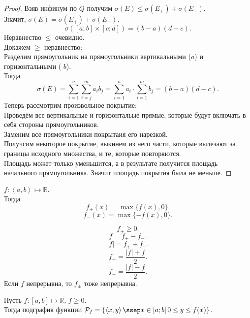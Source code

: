 \documentclass[11pt, oneside]{article}   	%
\begin{document}
\begin{theorem}
\begin{proof}
            Взяв инфинум по $Q$ получим $\sigma(E) \le \sigma(E_{+}) + \sigma(E_{-})$.\\
            Значит, $\sigma(E) = \sigma(E_{+}) + \sigma(E_{-})$.\\
            \[ \sigma([a; b] \times [c; d]) = (b-a)(d-c) .\]
            Неравнество $\le$ очевидно.\\
            Докажем $\ge$ неравнество:\\
            Разделим прямоугольник на прямоугольники вертикальными ($a$) и горизонтальными ( $b$).\\
            Тогда 
            \[ \sigma(E) = \sum\limits_{i=1}^{n}\sum\limits_{i=j}^{m}a_ib_j = \sum\limits_{i=1}^{n}a_i \cdot \sum\limits_{i=1}^{m} b_j = (b-a)(d-c) .\]
            Теперь рассмотрим произвольное покрытие:\\
            Проведём все вертикальные и горизонтальые прямые, которые будут включать в себя стороны прямоугольников.\\
            Заменим все прямоугольники покрытаия его нарезкой.\\
            Получсим некоторое покрытие, выкинем из него части, которые вылезают за границы исходного множества, и те, которые повторяются.\\
            Площадь может только уменьшится, а в результате получится площадь начального прямоугольника. Значит площадь покрытия была не меньше.
        \end{proof}
    \end{theorem}
    \begin{definition}
        $f: \left<a, b\right> \mapsto \mathbb{R}$.\\
        Тогда 
        \[f_{+}(x) = \max \{f(x), 0\} .\]
        \[ f_{-}(x) = \max \{-f(x), 0\}  .\] 
    \end{definition}
    \begin{dlemma}
        \[f_\pm \ge 0.\]
         \[ f = f_{+} - f_{-} .\]
         \[ |f| = f_{+} + f_{-} .\]
         \[ f_{+} = \frac{|f| + f}{2} .\]
         \[ f_{-} = \frac{|f| - f}{2} .\]
         Если $f$ непрерывна, то $f_\pm$ тоже непрерывна.
    \end{dlemma}
    \begin{definition}
        Пусть $f: \left[a, b\right] \mapsto \mathbb{R}$, $f \ge 0$.\\
        Тогда подграфик функции $\mathcal{P}_f = \{\left<x, y\right>\ssep x\in \left[a; b\right] 0 \le y \le f(x)\} $.\\
    \end{definition}
\end{document}
